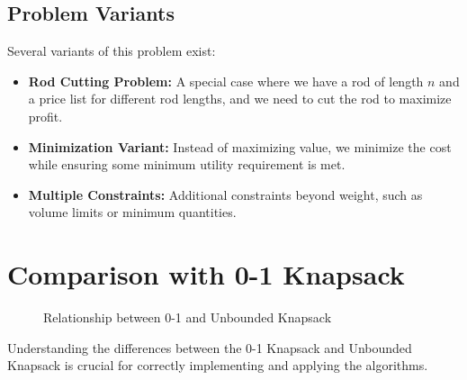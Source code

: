 \documentclass{article}
\begin{document}
\subsection{Problem Variants}

Several variants of this problem exist:

\begin{itemize}[leftmargin=*]
  \item \textbf{Rod Cutting Problem:} A special case where we have a rod of length $n$ and a price list for different rod lengths, and we need to cut the rod to maximize profit.
  
  \item \textbf{Minimization Variant:} Instead of maximizing value, we minimize the cost while ensuring some minimum utility requirement is met.
  
  \item \textbf{Multiple Constraints:} Additional constraints beyond weight, such as volume limits or minimum quantities.
\end{itemize}

\section{Comparison with 0-1 Knapsack}

\begin{figure}[h]
\centering
{}
\caption{Relationship between 0-1 and Unbounded Knapsack}
\end{figure}

Understanding the differences between the 0-1 Knapsack and Unbounded Knapsack is crucial for correctly implementing and applying the algorithms.
\end{document}
